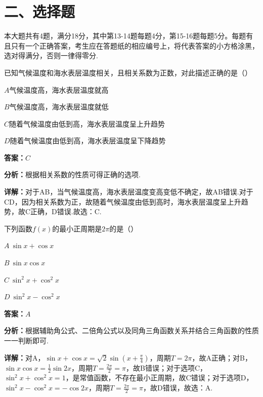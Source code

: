 \section*{二、选择题}
本大题共有4题，满分18分，其中第13-14题每题4分，第15-16题每题5分。每题有且只有一个正确答案，考生应在答题纸的相应编号上，将代表答案的小方格涂黑，选对得满分，否则一律得零分.

\begin{question}[points=4]
已知气候温度和海水表层温度相关，且相关系数为正数，对此描述正确的是（\quad\quad）
\begin{choices}
  \item $A$气候温度高，海水表层温度就高
  \item $B$气候温度高，海水表层温度就低
  \item $C$随着气候温度由低到高，海水表层温度呈上升趋势
  \item $D$随着气候温度由低到高，海水表层温度呈下降趋势
\end{choices}
\begin{solution}
\textbf{答案：}$C$

\textbf{分析：}根据相关系数的性质可得正确的选项.

\textbf{详解：}对于AB，当气候温度高，海水表层温度变高变低不确定，故AB错误.对于CD，因为相关系数为正，故随着气候温度由低到高时，海水表层温度呈上升趋势，故C正确，D错误.故选：C.
\end{solution}
\end{question}

\begin{question}[points=4]
下列函数$f(x)$的最小正周期是$2\pi$的是（\quad\quad）
\begin{choices}
  \item $A\ \sin x+\cos x$
  \item $B\ \sin x\cos x$
  \item $C\ \sin^2x+\cos^2x$
  \item $D\ \sin^2x-\cos^2x$
\end{choices}
\begin{solution}
\textbf{答案：}$A$

\textbf{分析：}根据辅助角公式、二倍角公式以及同角三角函数关系并结合三角函数的性质一一判断即可.

\textbf{详解：}对A，$\sin x+\cos x=\sqrt{2}\sin\left(x+\frac{\pi}{4}\right)$，周期$T=2\pi$，故A正确；对B，$\sin x\cos x=\frac{1}{2}\sin2x$，周期$T=\frac{2\pi}{2}=\pi$，故B错误；对于选项C，$\sin^2x+\cos^2x=1$，是常值函数，不存在最小正周期，故C错误；对于选项D，$\sin^2x-\cos^2x=-\cos2x$，周期$T=\frac{2\pi}{2}=\pi$，故D错误，故选：A.
\end{solution}
\end{question}

